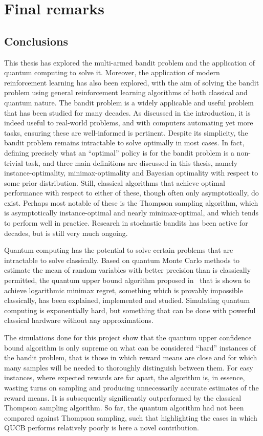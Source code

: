 \chapter{Final remarks}
\label{chap:final}

\section{Conclusions}
This thesis has explored the multi-armed bandit problem and the application of quantum computing to solve it.
Moreover, the application of modern reinforcement learning has also been explored, with the aim of solving the bandit problem using general reinforcement learning algorithms of both classical and quantum nature.
The bandit problem is a widely applicable and useful problem that has been studied for many decades.
As discussed in the introduction, it is indeed useful to real-world problems, and with computers automating yet more tasks, ensuring these are well-informed is pertinent.
Despite its simplicity, the bandit problem remains intractable to solve optimally in most cases.
In fact, defining precisely what an \enquote{optimal} policy is for the bandit problem is a non-trivial task, and three main definitions are discussed in this thesis, namely instance-optimality, minimax-optimality and Bayesian optimality with respect to some prior distribution.
Still, classical algorithms that achieve optimal performance with respect to either of these, though often only asymptotically, do exist.
Perhaps most notable of these is the Thompson sampling algorithm, which is asymptotically instance-optimal and nearly minimax-optimal, and which tends to perform well in practice.
Research in stochastic bandits has been active for decades, but is still very much ongoing.

Quantum computing has the potential to solve certain problems that are intractable to solve classically.
Based on quantum Monte Carlo methods to estimate the mean of random variables with better precision than is classically permitted, the quantum upper bound algorithm proposed in~\autocite{wan2022} that is shown to achieve logarithmic minimax regret, something which is provably impossible classically, has been explained, implemented and studied.
Simulating quantum computing is exponentially hard, but something that can be done with powerful classical hardware without any approximations.

The simulations done for this project show that the quantum upper confidence bound algorithm is only supreme on what can be considered \enquote{hard} instances of the bandit problem, that is those in which reward means are close and for which many samples will be needed to thoroughly distinguish between them.
For easy instances, where expected rewards are far apart, the algorithm is, in essence, wasting turns on sampling and producing unnecessarily accurate estimates of the reward means.
It is subsequently significantly outperformed by the classical Thompson sampling algorithm.
So far, the quantum algorithm had not been compared against Thompson sampling, such that highlighting the cases in which QUCB performs relatively poorly is here a novel contribution.

